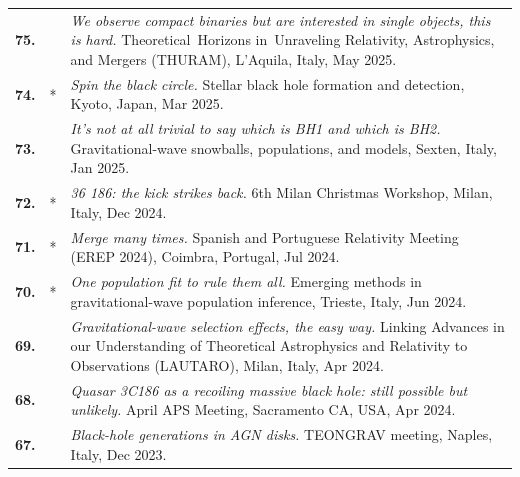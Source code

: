 {\begin{longtable}{rp{0.3cm}p{15.8cm}}
%
\textbf{75.} &  & \textit{We observe compact binaries but are interested in single objects, this is hard.}
\newline{}
Theoretical Horizons in Unraveling Relativity, Astrophysics, and Mergers (THURAM), L'Aquila, Italy, May 2025.
\vspace{0.05cm}\\
%
\textbf{74.} & * & \textit{Spin the black circle.}
\newline{}
Stellar black hole formation and detection, Kyoto, Japan, Mar 2025.
\vspace{0.05cm}\\
%
\textbf{73.} &  & \textit{It’s not at all trivial to say which is BH1 and which is BH2.}
\newline{}
Gravitational-wave snowballs, populations, and models, Sexten, Italy, Jan 2025.
\vspace{0.05cm}\\
%
\textbf{72.} & * & \textit{36 186: the kick strikes back.}
\newline{}
6th Milan Christmas Workshop, Milan, Italy, Dec 2024.
\vspace{0.05cm}\\
%
\textbf{71.} & * & \textit{Merge many times.}
\newline{}
Spanish and Portuguese Relativity Meeting (EREP 2024), Coimbra, Portugal, Jul 2024.
\vspace{0.05cm}\\
%
\textbf{70.} & * & \textit{One population fit to rule them all.}
\newline{}
Emerging methods in gravitational-wave population inference, Trieste, Italy, Jun 2024.
\vspace{0.05cm}\\
%
\textbf{69.} &  & \textit{Gravitational-wave selection effects, the easy way.}
\newline{}
Linking Advances in our Understanding of Theoretical Astrophysics and Relativity to Observations (LAUTARO), Milan, Italy, Apr 2024.
\vspace{0.05cm}\\
%
\textbf{68.} &  & \textit{Quasar 3C186 as a recoiling massive black hole: still possible but unlikely.}
\newline{}
April APS Meeting, Sacramento CA, USA, Apr 2024.
\vspace{0.05cm}\\
%
\textbf{67.} &  & \textit{Black-hole generations in AGN disks.}
\newline{}
TEONGRAV meeting, Naples, Italy, Dec 2023.

\end{longtable}}

